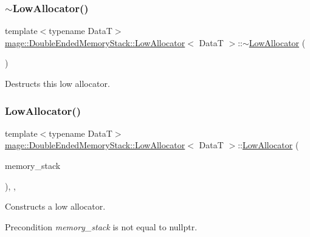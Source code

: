 \subsubsection{\texorpdfstring{$\sim$\+Low\+Allocator()}{~LowAllocator()}}
{\footnotesize\ttfamily template$<$typename DataT$>$ \\
\hyperlink{structmage_1_1_double_ended_memory_stack_1_1_low_allocator}{mage\+::\+Double\+Ended\+Memory\+Stack\+::\+Low\+Allocator}$<$ DataT $>$\+::$\sim$\hyperlink{structmage_1_1_double_ended_memory_stack_1_1_low_allocator}{Low\+Allocator} (\begin{DoxyParamCaption}{ }\end{DoxyParamCaption})\hspace{0.3cm}{\ttfamily [default]}}

Destructs this low allocator. \hypertarget{structmage_1_1_double_ended_memory_stack_1_1_low_allocator_a7c9da2fad702eedb0bb16de047c99238}{}\label{structmage_1_1_double_ended_memory_stack_1_1_low_allocator_a7c9da2fad702eedb0bb16de047c99238} 
\subsubsection{\texorpdfstring{Low\+Allocator()}{LowAllocator()}\hspace{0.1cm}{\footnotesize\ttfamily [4/4]}}
{\footnotesize\ttfamily template$<$typename DataT$>$ \\
\hyperlink{structmage_1_1_double_ended_memory_stack_1_1_low_allocator}{mage\+::\+Double\+Ended\+Memory\+Stack\+::\+Low\+Allocator}$<$ DataT $>$\+::\hyperlink{structmage_1_1_double_ended_memory_stack_1_1_low_allocator}{Low\+Allocator} (\begin{DoxyParamCaption}\item[{\hyperlink{classmage_1_1_double_ended_memory_stack}{Double\+Ended\+Memory\+Stack} $\ast$}]{memory\+\_\+stack }\end{DoxyParamCaption})\hspace{0.3cm}{\ttfamily [explicit]}, {\ttfamily [private]}, {\ttfamily [noexcept]}}

Constructs a low allocator.

\begin{DoxyPrecond}{Precondition}
{\itshape memory\+\_\+stack} is not equal to {\ttfamily nullptr}. 
\end{DoxyPrecond}

